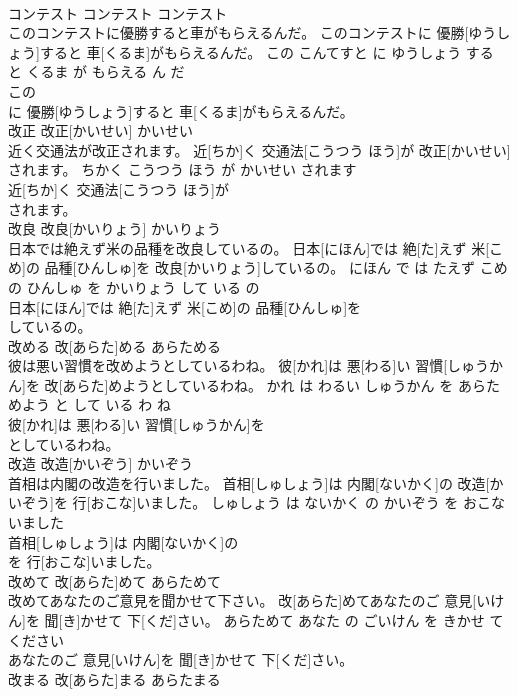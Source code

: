 \documentclass[8pt]{extreport}
\begin{document}
\begin{CJK}{UTF8}{min}
\\	コンテスト	コンテスト	コンテスト	
\\	このコンテストに優勝すると車がもらえるんだ。	このコンテストに 優勝[ゆうしょう]すると 車[くるま]がもらえるんだ。	この こんてすと に ゆうしょう する と くるま が もらえる ん だ	
\\	この
\\	に 優勝[ゆうしょう]すると 車[くるま]がもらえるんだ。			
\\	改正	改正[かいせい]	かいせい	
\\	近く交通法が改正されます。	近[ちか]く 交通法[こうつう ほう]が 改正[かいせい]されます。	ちかく こうつう ほう が かいせい されます	
\\	近[ちか]く 交通法[こうつう ほう]が
\\	されます。			
\\	改良	改良[かいりょう]	かいりょう	
\\	日本では絶えず米の品種を改良しているの。	日本[にほん]では 絶[た]えず 米[こめ]の 品種[ひんしゅ]を 改良[かいりょう]しているの。	にほん で は たえず こめ の ひんしゅ を かいりょう して いる の	
\\	日本[にほん]では 絶[た]えず 米[こめ]の 品種[ひんしゅ]を
\\	しているの。			
\\	改める	改[あらた]める	あらためる	
\\	彼は悪い習慣を改めようとしているわね。	彼[かれ]は 悪[わる]い 習慣[しゅうかん]を 改[あらた]めようとしているわね。	かれ は わるい しゅうかん を あらためよう と して いる わ ね	
\\	彼[かれ]は 悪[わる]い 習慣[しゅうかん]を
\\	としているわね。			
\\	改造	改造[かいぞう]	かいぞう	
\\	首相は内閣の改造を行いました。	首相[しゅしょう]は 内閣[ないかく]の 改造[かいぞう]を 行[おこな]いました。	しゅしょう は ないかく の かいぞう を おこないました	
\\	首相[しゅしょう]は 内閣[ないかく]の
\\	を 行[おこな]いました。			
\\	改めて	改[あらた]めて	あらためて	
\\	改めてあなたのご意見を聞かせて下さい。	改[あらた]めてあなたのご 意見[いけん]を 聞[き]かせて 下[くだ]さい。	あらためて あなた の ごいけん を きかせ て ください	
\\	あなたのご 意見[いけん]を 聞[き]かせて 下[くだ]さい。			
\\	改まる	改[あらた]まる	あらたまる	

\end{CJK}
\end{document}
